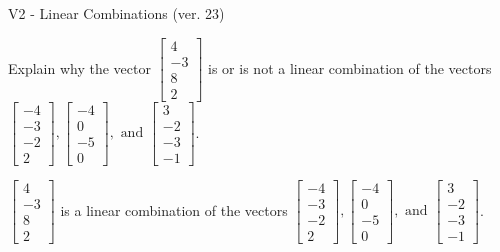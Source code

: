 \begin{exercise}
  \begin{exerciseTitle}V2 - Linear Combinations (ver. 23)\end{exerciseTitle}
  \begin{exerciseStatement}
    Explain why the vector \(\left[\begin{array}{c}
4 \\
-3 \\
8 \\
2
\end{array}\right]\)  is or is not a linear 
	combination of the vectors \(\left[\begin{array}{c}
-4 \\
-3 \\
-2 \\
2
\end{array}\right] , \left[\begin{array}{c}
-4 \\
0 \\
-5 \\
0
\end{array}\right] , \text{ and } \left[\begin{array}{c}
3 \\
-2 \\
-3 \\
-1
\end{array}\right]\).
	


  \end{exerciseStatement}
  \begin{exerciseAnswer}
   \(\left[\begin{array}{c}
4 \\
-3 \\
8 \\
2
\end{array}\right]\) 
  	 is  
	a linear combination of the vectors \(\left[\begin{array}{c}
-4 \\
-3 \\
-2 \\
2
\end{array}\right] , \left[\begin{array}{c}
-4 \\
0 \\
-5 \\
0
\end{array}\right] , \text{ and } \left[\begin{array}{c}
3 \\
-2 \\
-3 \\
-1
\end{array}\right]\).

	
  


  \end{exerciseAnswer}
\end{exercise}